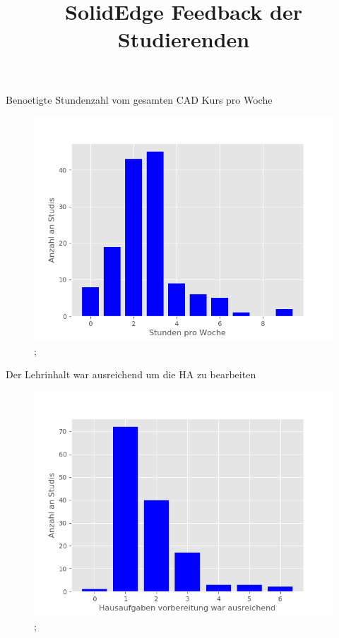 \documentclass[10pt]{beamer}
\title{SolidEdge Feedback der Studierenden}
\begin{document}
 
     \maketitle 
\begin{frame}[fragile]{Benoetigte Stundenzahl vom gesamten CAD Kurs pro Woche} 
 \begin{figure}
 \includegraphics[width= 0.9\linewidth]{./PDFcreater/Plots/Benoetigte+Stundenzahl+vom+gesamten+CAD+Kurs+pro+Woche.png};
 \end{figure}
 \end{frame}
\begin{frame}[fragile]{Der Lehrinhalt war ausreichend um die HA zu bearbeiten} 
 \begin{figure}
 \includegraphics[width= 0.9\linewidth]{./PDFcreater/Plots/Der+Lehrinhalt+war+ausreichend+um+die+HA+zu+bearbeiten.png};
 \end{figure}
 \end{frame}
\end{document}
